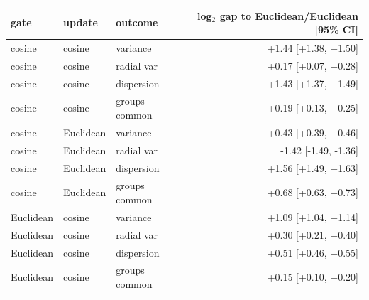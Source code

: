 \begin{tabular}{lllr}
\toprule
gate & update & outcome & log$_2$ gap to Euclidean/Euclidean [95\% CI] \\
\midrule
cosine & cosine & variance & +1.44 [+1.38, +1.50] \\
cosine & cosine & radial var & +0.17 [+0.07, +0.28] \\
cosine & cosine & dispersion & +1.43 [+1.37, +1.49] \\
cosine & cosine & groups common & +0.19 [+0.13, +0.25] \\
cosine & Euclidean & variance & +0.43 [+0.39, +0.46] \\
cosine & Euclidean & radial var & -1.42 [-1.49, -1.36] \\
cosine & Euclidean & dispersion & +1.56 [+1.49, +1.63] \\
cosine & Euclidean & groups common & +0.68 [+0.63, +0.73] \\
Euclidean & cosine & variance & +1.09 [+1.04, +1.14] \\
Euclidean & cosine & radial var & +0.30 [+0.21, +0.40] \\
Euclidean & cosine & dispersion & +0.51 [+0.46, +0.55] \\
Euclidean & cosine & groups common & +0.15 [+0.10, +0.20] \\
\bottomrule
\end{tabular}
